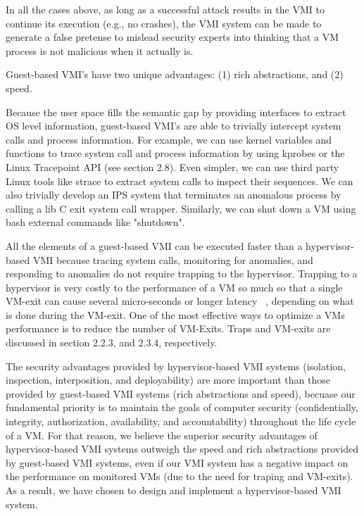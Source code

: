 \documentclass{report}
\begin{document}
\begin{spacing}{1.5}
{\large
\noindent In all the cases above, as long as a successful attack results in the VMI to continue its execution (e.g., no crashes), the VMI system can be made to generate a false pretense to mislead security experts into thinking that a VM process is not malicious when it actually is.
\newline
}


{\large
\noindent Guest-based VMI's have two unique advantages: (1) rich abstractions, and (2) speed. 
\newline
}


{\large
\noindent Because the user space fills the semantic gap by providing interfaces to extract OS level information, guest-based VMI's are able to trivially intercept system calls and process information. For example, we can use kernel variables and functions to trace system call and process information by using kprobes or the Linux Tracepoint API (see section 2.8). Even simpler, we can use third party Linux tools like strace to extract system calls to inspect their sequences. We can also trivially develop an IPS system that terminates an anomalous process by calling a lib C exit system call wrapper. Similarly, we can shut down a VM using bash external commands like "shutdown".
\newline
}


{\large
\noindent All the elements of a guest-based VMI can be executed faster than a hypervisor-based VMI because tracing system calls, monitoring for anomalies, and responding to anomalies do not require trapping to the hypervisor. Trapping to a hypervisor is very costly to the performance of a VM so much so that a single VM-exit can cause several micro-seconds or longer latency ~\cite{poon2012improving}, depending on what is done during the VM-exit. One of the most effective ways to optimize a VMs performance is to reduce the number of VM-Exits. Traps and VM-exits are discussed in section 2.2.3, and 2.3.4, respectively. 
\newline
}


{\large
\noindent The security advantages provided by hypervisor-based VMI systems (isolation, inspection, interposition, and deployability) are more important than those provided by guest-based VMI systems (rich abstractions and speed), becuase our fundamental priority is to maintain the goals of computer security (confidentially, integrity, authorization, availability, and accountability) throughout the life cycle of a VM. For that reason, we believe the superior security advantages of hypervisor-based VMI systems outweigh the speed and rich abstractions provided by guest-based VMI systems, even if our VMI system has a negative impact on the performance on monitored VMs (due to the need for traping and VM-exits). As a result, we have chosen to design and implement a hypervisor-based VMI system.
\newline
}





\end{spacing}
\end{document}
